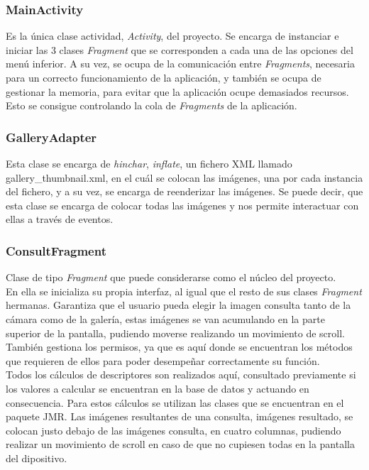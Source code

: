 \subsubsection{MainActivity}

Es la única clase actividad, \textit{Activity}, del proyecto. Se encarga de instanciar e iniciar las 3 clases \textit{Fragment} que se corresponden a cada una de las opciones del menú inferior. A su vez, se ocupa de la comunicación entre \textit{Fragments}, necesaria para un correcto funcionamiento de la aplicación, y también se ocupa de gestionar la memoria, para evitar que la aplicación ocupe demasiados recursos. Esto se consigue controlando la cola de \textit{Fragments} de la aplicación.

\subsubsection{GalleryAdapter}

Esta clase se encarga de \textit{hinchar}, \textit{inflate}, un fichero XML llamado gallery\_thumbnail.xml, en el cuál se colocan las imágenes, una por cada instancia del fichero, y a su vez, se encarga de reenderizar las imágenes. Se puede decir, que esta clase se encarga de colocar todas las imágenes y nos permite interactuar con ellas a través de eventos.

\subsubsection{ConsultFragment}

Clase de tipo \textit{Fragment} que puede considerarse como el núcleo del proyecto.\\

En ella se inicializa su propia interfaz, al igual que el resto de sus clases \textit{Fragment} hermanas. Garantiza que el usuario pueda elegir la imagen consulta tanto de la cámara como de la galería, estas imágenes se van acumulando en la parte superior de la pantalla, pudiendo moverse realizando un movimiento de scroll. También gestiona los permisos, ya que es aquí donde se encuentran los métodos que requieren de ellos para poder desempeñar correctamente su función.\\

Todos los cálculos de descriptores son realizados aquí, consultado previamente si los valores a calcular se encuentran en la base de datos y actuando en consecuencia. Para estos cálculos se utilizan las clases que se encuentran en el paquete JMR. Las imágenes resultantes de una consulta, imágenes resultado, se colocan justo debajo de las imágenes consulta, en cuatro columnas, pudiendo realizar un movimiento de scroll en caso de que no cupiesen todas en la pantalla del dipositivo.

